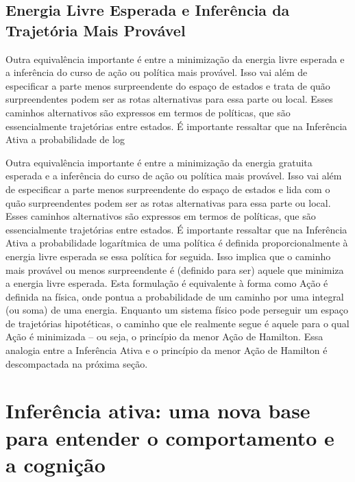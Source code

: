 \documentclass[
  12pt,
]{book}
\begin{document}
\hypertarget{energia-livre-esperada-e-inferuxeancia-da-trajetuxf3ria-mais-provuxe1vel}{%
\subsection{Energia Livre Esperada e Inferência da Trajetória Mais Provável}\label{energia-livre-esperada-e-inferuxeancia-da-trajetuxf3ria-mais-provuxe1vel}}

Outra equivalência importante é entre a minimização da energia livre esperada e a inferência do curso de ação ou política mais provável. Isso vai além de especificar a parte menos surpreendente do espaço de estados e trata de quão surpreendentes podem ser as rotas alternativas para essa parte ou local. Esses caminhos alternativos são expressos em termos de políticas, que são essencialmente trajetórias entre estados. É importante ressaltar que na Inferência Ativa a probabilidade de log

Outra equivalência importante é entre a minimização da energia gratuita esperada e a inferência do curso de ação ou política mais provável. Isso vai além de especificar a parte menos surpreendente do espaço de estados e lida com o quão surpreendentes podem ser as rotas alternativas para essa parte ou local. Esses caminhos alternativos são expressos em termos de políticas, que são essencialmente trajetórias entre estados. É importante ressaltar que na Inferência Ativa a probabilidade logarítmica de uma política é definida proporcionalmente à energia livre esperada se essa política for seguida. Isso implica que o caminho mais provável ou menos surpreendente é (definido para ser) aquele que minimiza a energia livre esperada. Esta formulação é equivalente à forma como Ação é definida na física, onde pontua a probabilidade de um caminho por uma integral (ou soma) de uma energia. Enquanto um sistema físico pode perseguir um espaço de trajetórias hipotéticas, o caminho que ele realmente segue é aquele para o qual Ação é minimizada -- ou seja, o princípio da menor Ação de Hamilton. Essa analogia entre a Inferência Ativa e o princípio da menor Ação de Hamilton é descompactada na próxima seção.

\hypertarget{inferuxeancia-ativa-uma-nova-base-para-entender-o-comportamento-e-a-cogniuxe7uxe3o}{%
\section{Inferência ativa: uma nova base para entender o comportamento e a cognição}\label{inferuxeancia-ativa-uma-nova-base-para-entender-o-comportamento-e-a-cogniuxe7uxe3o}}
\end{document}
